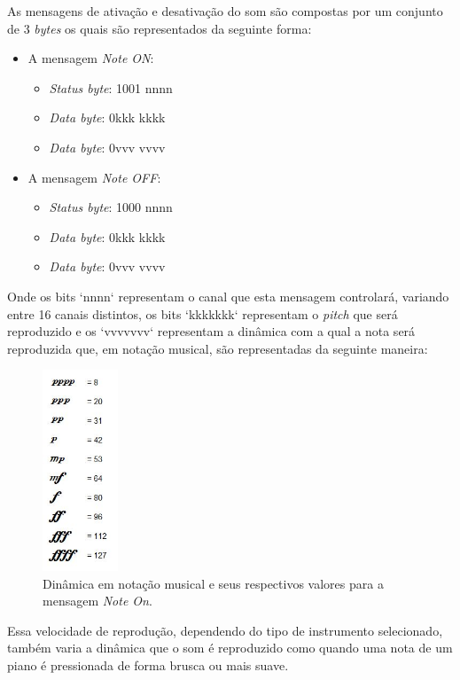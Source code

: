 \documentclass[12pt]{report}
\begin{document}
As mensagens de ativação e desativação do som são compostas por um
conjunto de 3 {\it bytes} os quais são representados da seguinte
forma:
\begin{itemize}
  \item A mensagem {\it Note ON}:
  \begin{itemize}
    \item {\it Status byte}: 1001 nnnn
    \item {\it Data byte}: 0kkk kkkk
    \item {\it Data byte}: 0vvv vvvv
  \end{itemize}
  \item A mensagem {\it Note OFF}:
  \begin{itemize}
    \item {\it Status byte}: 1000 nnnn
    \item {\it Data byte}: 0kkk kkkk
    \item {\it Data byte}: 0vvv vvvv
  \end{itemize}
\end{itemize}

Onde os bits `nnnn` representam o canal que esta mensagem controlará,
variando entre 16 canais distintos, os bits `kkkkkkk` representam o
{\it pitch} que será reproduzido e os `vvvvvvv` representam a dinâmica
com a qual a nota será reproduzida que, em notação musical, são
representadas da seguinte maneira:

\begin{figure}[H]
  \centering
    \includegraphics[width=0.2\textwidth]{imagens/nuance-velocity-table.jpg}
    \caption{Dinâmica em notação musical e seus respectivos valores
      para a mensagem {\it Note On}.}
  \label{fig:Velocidades em notação musical}
\end{figure}

Essa velocidade de reprodução, dependendo do tipo de instrumento
selecionado, também varia a dinâmica que o som é reproduzido como
quando uma nota de um piano é pressionada de forma brusca ou mais
suave.
\end{document}
